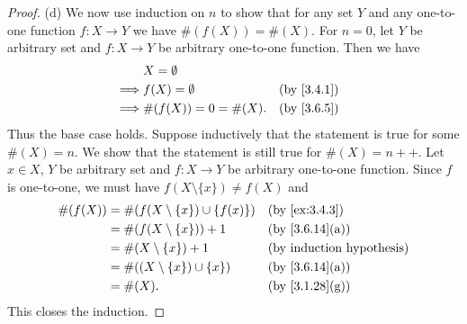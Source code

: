 \begin{proof}{(d)}
  We now use induction on \(n\) to show that for any set \(Y\) and any one-to-one function \(f : X \to Y\) we have \(\#(f(X)) = \#(X)\).
  For \(n = 0\), let \(Y\) be arbitrary set and \(f : X \to Y\) be arbitrary one-to-one function.
  Then we have
  \begin{align*}
             & X = \emptyset                         \\
    \implies & f(X) = \emptyset      &  & \by{3.4.1} \\
    \implies & \#(f(X)) = 0 = \#(X). &  & \by{3.6.5}
  \end{align*}
  Thus the base case holds.
  Suppose inductively that the statement is true for some \(\#(X) = n\).
  We show that the statement is still true for \(\#(X) = n++\).
  Let \(x \in X\), \(Y\) be arbitrary set and \(f : X \to Y\) be arbitrary one-to-one function.
  Since \(f\) is one-to-one, we must have \(f(X \setminus \{x\}) \neq f(X)\) and
  \begin{align*}
    \#(f(X)) & = \#(f(X \setminus \{x\}) \cup \{f(x)\}) &  & \text{(by \cref{ex:3.4.3})}  \\
             & = \#(f(X \setminus \{x\})) + 1           &  & \text{(by \cref{3.6.14}(a))} \\
             & = \#(X \setminus \{x\}) + 1              &  & \byIH                        \\
             & = \#((X \setminus \{x\}) \cup \{x\})     &  & \text{(by \cref{3.6.14}(a))} \\
             & = \#(X).                                 &  & \text{(by \cref{3.1.28}(g))}
  \end{align*}
  This closes the induction.
\end{proof}

